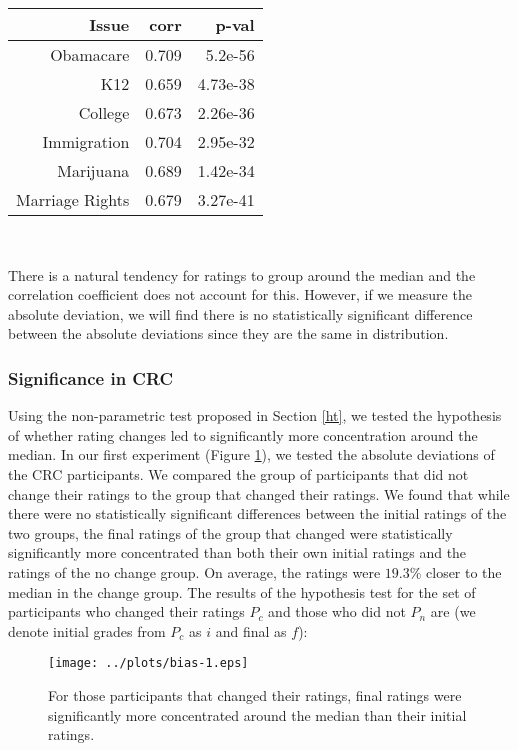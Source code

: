 {\centering
\scriptsize
\begin{tabular}[!ht] { r | r | r }
\label{ref-2}
  Issue & corr & p-val \\
  \hline
  \hline
  Obamacare &  0.709 & 5.2e-56 \\
  \hline
  K12 & 0.659 & 4.73e-38 \\
  \hline
  College & 0.673 & 2.26e-36 \\
  \hline
  Immigration & 0.704 & 2.95e-32\\
  \hline
  Marijuana & 0.689 & 1.42e-34\\
  \hline
  Marriage Rights & 0.679 & 3.27e-41 \\
\end{tabular}\\[1\baselineskip]
}
There is a natural tendency for ratings to group around the median and the correlation coefficient does not account for this.
However, if we measure the absolute deviation, we will find there is no statistically significant difference between the absolute deviations since they are the same in distribution.

\subsubsection{Significance in CRC}
Using the non-parametric test proposed in Section \ref{ht}, we tested the hypothesis of whether rating changes led to significantly more concentration around the median.
In our first experiment (Figure \ref{mdev-1}), we tested the absolute deviations of the CRC participants.
We compared the group of participants that did not change their ratings to the group that changed their ratings.
We found that while there were no statistically significant differences between the initial ratings of the two groups, the final ratings of the group that changed were statistically significantly more concentrated than both their own initial ratings and the ratings of the no change group.
On average, the ratings were $19.3\%$ closer to the median in the change group.
The results of the hypothesis test for the set of participants who changed their ratings $P_c$ and those who did not $P_n$ are (we denote initial grades from $P_c$ as $i$ and final as $f$):
\vspace{-0.5em}
\begin{figure}[h]
\centering
    \texttt{[image: ../plots/bias-1.eps]}
      \caption{For those participants that changed their ratings, final ratings were significantly more concentrated around the median than their initial ratings.}
      \label{mdev-1}
\end{figure}

